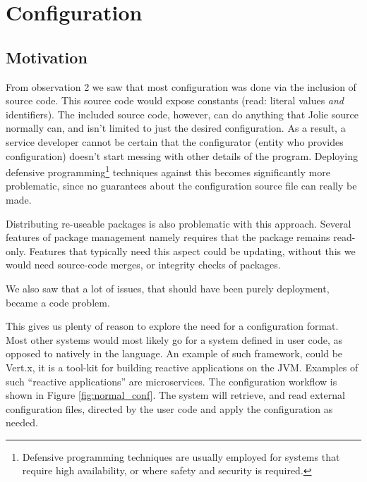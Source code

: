 \section{Configuration}


\subsection{Motivation}

From observation 2 we saw that most configuration was done via the inclusion of
source code. This source code would expose constants (read: literal values
\emph{and} identifiers). The included source code, however, can do anything
that Jolie source normally can, and isn't limited to just the desired
configuration. As a result, a service developer cannot be certain that the
configurator (entity who provides configuration) doesn't start messing with
other details of the program. Deploying defensive
programming\footnote{Defensive programming techniques are usually employed for
systems that require high availability, or where safety and security is
required.} techniques against this becomes significantly more problematic,
since no guarantees about the configuration source file can really be made.

Distributing re-useable packages is also problematic with this approach.
Several features of package management namely requires that the package remains
read-only. Features that typically need this aspect could be updating, without
this we would need source-code merges, or integrity checks of packages.

We also saw that a lot of issues, that should have been purely deployment,
became a code problem.

This gives us plenty of reason to explore the need for a configuration format.
Most other systems would most likely go for a system defined in user code, as
opposed to natively in the language. An example of such framework, could be
Vert.x, it is a tool-kit for building reactive applications on the JVM.
Examples of such ``reactive applications'' are microservices. The configuration
workflow is shown in Figure \ref{fig:normal_conf}. The system will retrieve,
and read external configuration files, directed by the user code and apply the
configuration as needed.


